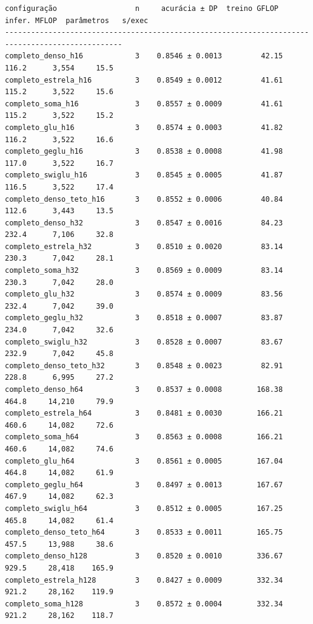\documentclass[10pt,a4paper]{article}
\begin{document}
{\fontsize{8.5}{10.2}\selectfont
\begin{verbatim}
configuração                  n     acurácia ± DP  treino GFLOP  infer. MFLOP  parâmetros   s/exec
-------------------------------------------------------------------------------------------------
completo_denso_h16            3    0.8546 ± 0.0013         42.15         116.2      3,554     15.5
completo_estrela_h16          3    0.8549 ± 0.0012         41.61         115.2      3,522     15.6
completo_soma_h16             3    0.8557 ± 0.0009         41.61         115.2      3,522     15.2
completo_glu_h16              3    0.8574 ± 0.0003         41.82         116.2      3,522     16.6
completo_geglu_h16            3    0.8538 ± 0.0008         41.98         117.0      3,522     16.7
completo_swiglu_h16           3    0.8545 ± 0.0005         41.87         116.5      3,522     17.4
completo_denso_teto_h16       3    0.8552 ± 0.0006         40.84         112.6      3,443     13.5
completo_denso_h32            3    0.8547 ± 0.0016         84.23         232.4      7,106     32.8
completo_estrela_h32          3    0.8510 ± 0.0020         83.14         230.3      7,042     28.1
completo_soma_h32             3    0.8569 ± 0.0009         83.14         230.3      7,042     28.0
completo_glu_h32              3    0.8574 ± 0.0009         83.56         232.4      7,042     39.0
completo_geglu_h32            3    0.8518 ± 0.0007         83.87         234.0      7,042     32.6
completo_swiglu_h32           3    0.8528 ± 0.0007         83.67         232.9      7,042     45.8
completo_denso_teto_h32       3    0.8548 ± 0.0023         82.91         228.8      6,995     27.2
completo_denso_h64            3    0.8537 ± 0.0008        168.38         464.8     14,210     79.9
completo_estrela_h64          3    0.8481 ± 0.0030        166.21         460.6     14,082     72.6
completo_soma_h64             3    0.8563 ± 0.0008        166.21         460.6     14,082     74.6
completo_glu_h64              3    0.8561 ± 0.0005        167.04         464.8     14,082     61.9
completo_geglu_h64            3    0.8497 ± 0.0013        167.67         467.9     14,082     62.3
completo_swiglu_h64           3    0.8512 ± 0.0005        167.25         465.8     14,082     61.4
completo_denso_teto_h64       3    0.8533 ± 0.0011        165.75         457.5     13,988     38.6
completo_denso_h128           3    0.8520 ± 0.0010        336.67         929.5     28,418    165.9
completo_estrela_h128         3    0.8427 ± 0.0009        332.34         921.2     28,162    119.9
completo_soma_h128            3    0.8572 ± 0.0004        332.34         921.2     28,162    118.7

\end{verbatim}}
\end{document}
